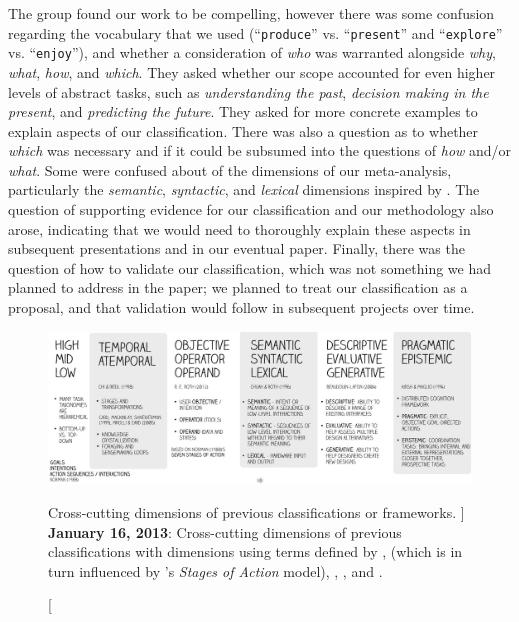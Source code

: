 \begin{sloppypar}
The group found our work to be compelling, however there was some confusion regarding the vocabulary that we used (\eg ``{\tt produce}'' vs. ``{\tt present}'' and ``{\tt explore}'' vs. ``{\tt enjoy}''), and whether a consideration of {\it who} was warranted alongside {\it why}, {\it what}, {\it how}, and {\it which}. 
They asked whether our scope accounted for even higher levels of abstract tasks, such as {\it understanding the past}, {\it decision making in the present}, and {\it predicting the future}.
They asked for more concrete examples to explain aspects of our classification.
There was also a question as to whether {\it which} was necessary and if it could be subsumed into the questions of {\it how} and/or {\it what}.
Some were confused about of the dimensions of our meta-analysis, particularly the {\it semantic}, {\it syntactic}, and {\it lexical} dimensions inspired by \citet{Chuah1996}.
The question of supporting evidence for our classification and our methodology also arose, indicating that we would need to thoroughly explain these aspects in subsequent presentations and in our eventual paper.
Finally, there was the question of how to validate our classification, which was not something we had planned to address in the paper; we planned to treat our classification as a proposal, and that validation would follow in subsequent projects over time.
\end{sloppypar}


\begin{figure}
	\centering
	\includegraphics[width=\textwidth]{figures/typology-cross-cuts.pdf}
	\caption
	[
	    Cross-cutting dimensions of previous classifications or frameworks.
	]
	{
	    {\bf January 16, 2013}: Cross-cutting dimensions of previous classifications with dimensions using terms defined by \citet{Chi1998}, \citet{Roth2012} (which is in turn influenced by \citet{Norman1988}'s {\it Stages of Action} model), \citet{Chuah1996}, \citet{Beaudouin-Lafon2004}, and \citet{Kirsh1994}.
	}
	\centering
	\label{app:typology:fig:cross-cuts}
\end{figure}

